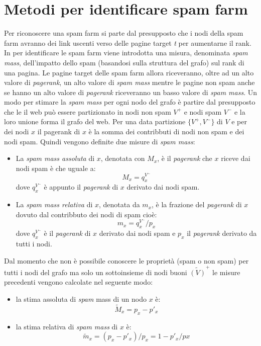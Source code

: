 \section{Metodi per identificare spam farm}
Per riconoscere una spam farm si parte dal presupposto che i nodi della spam farm avranno dei link uscenti verso delle pagine target \textit{t} per aumentarne il rank. In \cite{Gyongyi:2006:LSD:1182635.1164166} per identificare le spam farm viene introdotta una misura, denominata \textit{spam mass}, dell'impatto dello spam (basandosi sulla struttura del grafo) sul rank di una pagina. Le pagine target delle spam farm allora riceveranno, oltre ad un alto valore di \textit{pagerank}, un alto valore di \textit{spam mass} mentre le pagine non spam anche se hanno un alto valore di \textit{pagerank} riceveranno un basso valore di \textit{spam mass}. Un modo per stimare la \textit{spam mass} per ogni nodo del grafo è partire dal presupposto che le il web può essere partizionato in nodi non spam \(V^+\) e nodi spam \(V^-\) e la loro unione forma il grafo del web. Per una data partizione \(\{V^+,V^-\}\) di \(V\) e per dei nodi \(x\) il pagerank di \(x\) è la somma dei contribbuti di nodi non spam e dei nodi spam. 
Quindi vengono definite due misure di \textit{spam mass}:
\begin{itemize}
 \item La \textit{spam mass assoluta} di \(x\), denotata con \(M_x\), è il \textit{pagerank} che \(x\) riceve dai nodi spam è che uguale a:
 \begin{equation}
   M_x=q_x^{V^-}
 \end{equation}
dove \(q_x^{V^-}\) è appunto il \textit{pagerank} di \(x\) derivato dai nodi spam.
 \item La \textit{spam mass relativa} di \(x\), denotata da \(m_x\), è la frazione del \textit{pagerank} di \(x\) dovuto dal contribbuto dei nodi di spam cioè: 
 \begin{equation}
   m_x=q_x^{V^-}/p_x
 \end{equation}
dove \(q_x^{V^-}\) è il \textit{pagerank} di \(x\) derivato dai nodi spam e \(p_x\) il \textit{pagerank} derivato da tutti i nodi.
\end{itemize}
Dal momento che non è possibile conoscere le proprietà (spam o non spam) per tutti i nodi del grafo ma solo un sottoinsieme di nodi buoni \(\tilde{(V)}^+\) le misure precedenti vengono calcolate nel seguente modo:
\begin{itemize}
 \item la stima assoluta di \textit{spam} mass di un nodo \(x\) è:
 \begin{equation}
 \tilde{M}_x=p_x-p'_x
\end{equation}
\item la stima relativa di \textit{spam mass} di \(x\) è:
 \begin{equation}
 \tilde{m}_x=(p_x-p'_x)/p_x=1-p'_x/px
\end{equation}
\end{itemize}
